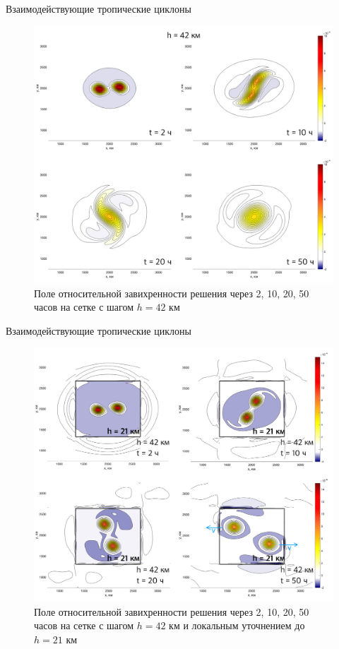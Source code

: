 \documentclass[10pt]{beamer}
\begin{document}
\begin{frame}{Взаимодействующие тропические циклоны}

\begin{figure}[h]
\centering
\includegraphics[width=0.7\linewidth]{./images/twocyccoarse.png}
\caption{Поле относительной завихренности решения через 2, 10, 20, 50 часов на сетке с шагом $h = 42$ км}
\label{fig:mpr}
\end{figure}

\end{frame}




\begin{frame}{Взаимодействующие тропические циклоны}

\begin{figure}[h]
\centering
\includegraphics[width=0.7\linewidth]{./images/twocyc.png}
\caption{Поле относительной завихренности решения через 2, 10, 20, 50 часов на сетке с шагом $h = 42$ км и локальным уточнением до $h = 21$ км}
\label{fig:mpr}
\end{figure}

\end{frame}
\end{document}
